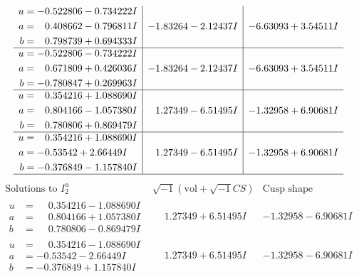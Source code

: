 \documentclass[1p]{elsarticle_modified}
\theoremstyle{definition}
\newcommand{\I}{\sqrt{-1}}
\begin{document}
$$\begin{array}{c|c|c}
\begin{aligned}
u &= -0.522806 - 0.734222 I \\
a &= \phantom{-}0.408662 - 0.796811 I \\
b &= \phantom{-}0.798739 + 0.694333 I\end{aligned}
 & -1.83264 - 2.12437 I & -6.63093 + 3.54511 I \\ \hline\begin{aligned}
u &= -0.522806 - 0.734222 I \\
a &= \phantom{-}0.671809 + 0.426036 I \\
b &= -0.780847 + 0.269963 I\end{aligned}
 & -1.83264 - 2.12437 I & -6.63093 + 3.54511 I \\ \hline\begin{aligned}
u &= \phantom{-}0.354216 + 1.088690 I \\
a &= \phantom{-}0.804166 - 1.057380 I \\
b &= \phantom{-}0.780806 + 0.869479 I\end{aligned}
 & \phantom{-}1.27349 - 6.51495 I & -1.32958 + 6.90681 I \\ \hline\begin{aligned}
u &= \phantom{-}0.354216 + 1.088690 I \\
a &= -0.53542 + 2.66449 I \\
b &= -0.376849 - 1.157840 I\end{aligned}
 & \phantom{-}1.27349 - 6.51495 I & -1.32958 + 6.90681 I\\
 \hline 
 \end{array}$$\newpage$$\begin{array}{c|c|c}  
\text{Solutions to }I^u_{2}& \I (\text{vol} + \sqrt{-1}CS) & \text{Cusp shape}\\
 \hline 
\begin{aligned}
u &= \phantom{-}0.354216 - 1.088690 I \\
a &= \phantom{-}0.804166 + 1.057380 I \\
b &= \phantom{-}0.780806 - 0.869479 I\end{aligned}
 & \phantom{-}1.27349 + 6.51495 I & -1.32958 - 6.90681 I \\ \hline\begin{aligned}
u &= \phantom{-}0.354216 - 1.088690 I \\
a &= -0.53542 - 2.66449 I \\
b &= -0.376849 + 1.157840 I\end{aligned}
 & \phantom{-}1.27349 + 6.51495 I & -1.32958 - 6.90681 I \\ \hline\begin{aligned}

\end{aligned}
\end{array}$$
\end{document}
